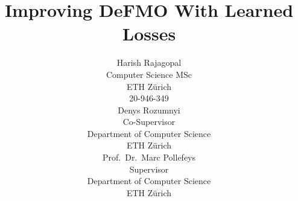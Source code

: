 \documentclass{article}
\title{Improving DeFMO With Learned Losses}
\author{%
    Harish Rajagopal \\
    Computer Science MSc \\
    ETH Zürich \\
    20-946-349 \\%
    \AND%
    Denys Rozumnyi \\
    Co-Supervisor \\
    Department of Computer Science \\
    ETH Zürich \\
    \And%
    Prof.\ Dr.\ Marc Pollefeys \\
    Supervisor \\
    Department of Computer Science \\
    ETH Zürich
}
\begin{document}
\maketitle









\small

\end{document}
